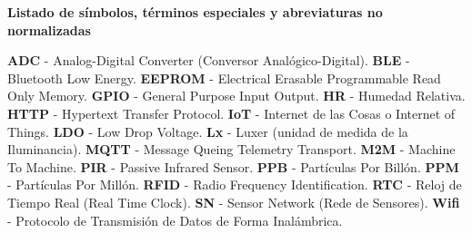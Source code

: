 \renewcommand{\thepage}{\Roman{page}}
    \textbf{\Large Listado de símbolos, términos especiales y abreviaturas no normalizadas}\newline

    \textbf{ADC} - Analog-Digital Converter (Conversor Analógico-Digital).
    \newline
    \textbf{BLE} - Bluetooth Low Energy.
    \newline
    \textbf{EEPROM} - Electrical Erasable Programmable Read Only Memory.
    \newline
    \textbf{GPIO} - General Purpose Input Output.
    \newline
    \textbf{HR} - Humedad Relativa.
    \newline
    \textbf{HTTP} - Hypertext Transfer Protocol.
    \newline
    \textbf{IoT} - Internet de las Cosas o Internet of Things.
    \newline
    \textbf{LDO} - Low Drop Voltage.
    \newline
    \textbf{Lx} - Luxer (unidad de medida de la Iluminancia).
    \newline
    \textbf{MQTT} - Message Queing Telemetry Transport.
    \newline
    \textbf{M2M} - Machine To Machine.
    \newline
    \textbf{PIR} - Passive Infrared Sensor.
    \newline
    \textbf{PPB} - Partículas Por Billón.
    \newline
    \textbf{PPM} - Partículas Por Millón.
    \newline
    \textbf{RFID} - Radio Frequency Identification.
    \newline
    \textbf{RTC} - Reloj de Tiempo Real (Real Time Clock).
    \newline
    \textbf{SN} - Sensor Network (Rede de Sensores).
    \newline
    \textbf{Wifi} - Protocolo de Transmisión de Datos de Forma Inalámbrica.
    
    \setcounter{page}{1}
    \thispagestyle{plain}
